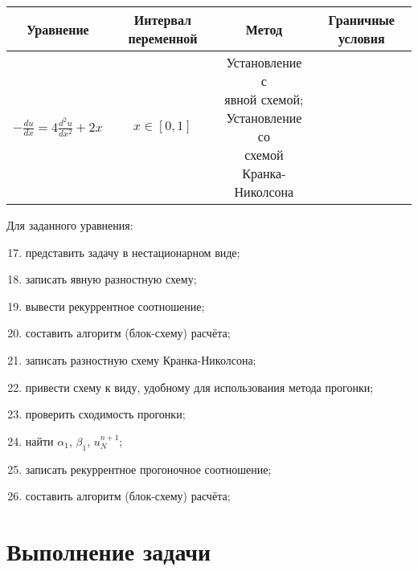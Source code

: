 \documentclass[12pt, a4paper]{report}
\begin{document}
	\begin{center}
		\begin{tabular}{||c|c|c|c||}
			\hline
			Уравнение & Интервал переменной & Метод & Граничные условия \\

			\hline
			$ -\frac{du}{dx}=4\frac{d^{2}u}{dx^{2}}+2x$ & $x \in [0, 1]$ & \makecell{Установление с \\ явной схемой; \\ Установление со \\ схемой Кранка- \\ Николсона} & \makecell{$ \begin{cases} \frac{du}{dx}(x = 0) = 2 \\ u(x = 1) = 2 \end{cases}$} \\

			\hline
		\end{tabular}
	\end{center}
	\par
	Для заданного уравнения:
	\begin{enumerate}
		\setcounter{enumi}{16}
		\item представить задачу в нестационарном виде;
		\item записать явную разностную схему;
		\item вывести рекуррентное соотношение;
		\item составить алгоритм (блок-схему) расчёта;
		\item записать разностную схему Кранка-Николсона;
		\item привести схему к виду, удобному для использования метода прогонки;
		\item проверить сходимость прогонки;
		\item найти $\alpha_1$, $\beta_1$, $u_{N}^{n+1}$;
		\item записать рекуррентное прогоночное соотношение;
		\item составить алгоритм (блок-схему) расчёта;
	\end{enumerate}

	\newpage

	\section*{Выполнение задачи}
\end{document}
